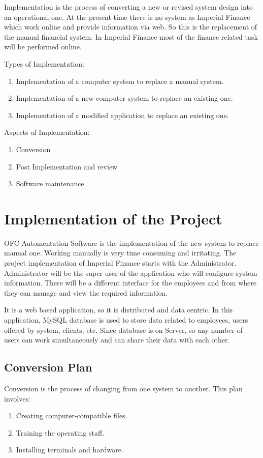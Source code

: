 Implementation is the process of converting a new or revised system 
design into an operational one. At the present time there is no system 
as Imperial Finance which work online and provide information via web.
So this is the replacement of the manual financial system. In Imperial 
Finance most of the finance related task will be performed online.

Types of Implementation:
\begin{enumerate}
\item Implementation of a computer system to replace a manual system.
\item Implementation of a new computer system to replace an existing one.
\item Implementation of a modified application to replace an existing one.
\end{enumerate}
\vskip 0.5cm
Aspects of Implementation:
\begin{enumerate}
\item Conversion
\item Post Implementation and review
\item Software maintenance
\end{enumerate}
\vskip 0.5cm
\section{Implementation of the Project }
OFC Automentation Software is the implementation of the new system to replace
manual one. Working manually is very time consuming and irritating. The project 
implementation of Imperial Finance starts with the Administrator. 
Administrator will be the super user of the application who will 
configure system information. There will be a different interface for the employees 
and from where they can manage and view the required information.

It is a web based application, so it is distributed and data centric. 
In this application, MySQL database is used to store data related to 
employees, users offered by system, clients, etc. Since database is on 
Server, so any number of users can work simultaneously and can share 
their data with each other.
\subsection{Conversion Plan}
Conversion is the process of changing from one system to another. This 
plan involves:
\begin{enumerate}
\item Creating computer-compatible files.
\item Training the operating staff.
\item Installing terminals and hardware.
\end{enumerate}
\newpage
